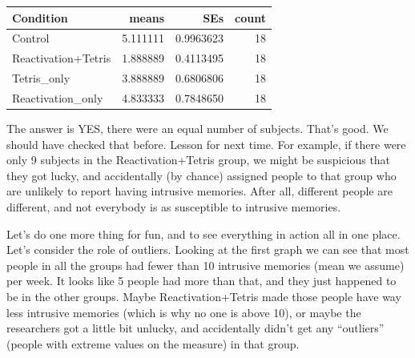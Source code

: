 \documentclass[]{book}
\newenvironment{Shaded}{\begin{snugshade}}{\end{snugshade}}
\newcommand{\KeywordTok}[1]{\textcolor[rgb]{0.13,0.29,0.53}{\textbf{{#1}}}}
\newcommand{\DataTypeTok}[1]{\textcolor[rgb]{0.13,0.29,0.53}{{#1}}}
\newcommand{\StringTok}[1]{\textcolor[rgb]{0.31,0.60,0.02}{{#1}}}
\newcommand{\NormalTok}[1]{{#1}}
\theoremstyle{definition}
\theoremstyle{definition}
\theoremstyle{definition}
\theoremstyle{remark}
\begin{document}
\begin{Shaded}
\end{Shaded}

\begin{tabular}{l|r|r|r}
\hline
Condition & means & SEs & count\\
\hline
Control & 5.111111 & 0.9963623 & 18\\
\hline
Reactivation+Tetris & 1.888889 & 0.4113495 & 18\\
\hline
Tetris\_only & 3.888889 & 0.6806806 & 18\\
\hline
Reactivation\_only & 4.833333 & 0.7848650 & 18\\
\hline
\end{tabular}

The answer is YES, there were an equal number of subjects. That's good.
We should have checked that before. Lesson for next time. For example,
if there were only 9 subjects in the Reactivation+Tetris group, we might
be suspicious that they got lucky, and accidentally (by chance) assigned
people to that group who are unlikely to report having intrusive
memories. After all, different people are different, and not everybody
is as susceptible to intrusive memories.

Let's do one more thing for fun, and to see everything in action all in
one place. Let's consider the role of outliers. Looking at the first
graph we can see that most people in all the groups had fewer than 10
intrusive memories (mean we assume) per week. It looks like 5 people had
more than that, and they just happened to be in the other groups. Maybe
Reactivation+Tetris made those people have way less intrusive memories
(which is why no one is above 10), or maybe the researchers got a little
bit unlucky, and accidentally didn't get any ``outliers'' (people with
extreme values on the measure) in that group.
\end{document}
